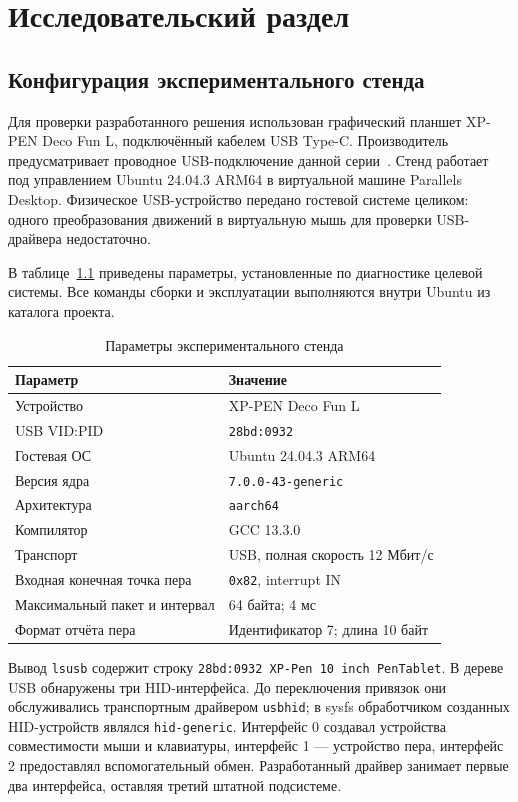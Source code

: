 \chapter{Исследовательский раздел}

\section{Конфигурация экспериментального стенда}

Для проверки разработанного решения использован графический планшет XP-PEN Deco Fun L, подключённый кабелем USB Type-C. Производитель предусматривает проводное USB-подключение данной серии~\cite{tablet}. Стенд работает под управлением Ubuntu 24.04.3 ARM64 в виртуальной машине Parallels Desktop. Физическое USB-устройство передано гостевой системе целиком: одного преобразования движений в виртуальную мышь для проверки USB-драйвера недостаточно.

В таблице~\ref{tab:stand} приведены параметры, установленные по диагностике целевой системы. Все команды сборки и эксплуатации выполняются внутри Ubuntu из каталога проекта.

\begin{table}[htbp]
\caption{Параметры экспериментального стенда}
\label{tab:stand}
\centering\small
\begin{tabular}{|p{}|p{}|}\hline
Параметр & Значение \\ \hline
Устройство & XP-PEN Deco Fun L \\ \hline
USB VID:PID & \texttt{28bd:0932} \\ \hline
Гостевая ОС & Ubuntu 24.04.3 ARM64 \\ \hline
Версия ядра & \texttt{7.0.0-43-generic} \\ \hline
Архитектура & \texttt{aarch64} \\ \hline
Компилятор & GCC 13.3.0 \\ \hline
Транспорт & USB, полная скорость 12 Мбит/с \\ \hline
Входная конечная точка пера & \texttt{0x82}, interrupt IN \\ \hline
Максимальный пакет и интервал & 64 байта; 4 мс \\ \hline
Формат отчёта пера & Идентификатор 7; длина 10 байт \\ \hline
\end{tabular}
\end{table}

Вывод \texttt{lsusb} содержит строку \texttt{28bd:0932 XP-Pen 10 inch PenTablet}. В дереве USB обнаружены три HID-интерфейса. До переключения привязок они обслуживались транспортным драйвером \texttt{usbhid}; в sysfs обработчиком созданных HID-устройств являлся \texttt{hid-generic}. Интерфейс 0 создавал устройства совместимости мыши и клавиатуры, интерфейс 1 --- устройство пера, интерфейс 2 предоставлял вспомогательный обмен. Разработанный драйвер занимает первые два интерфейса, оставляя третий штатной подсистеме.


